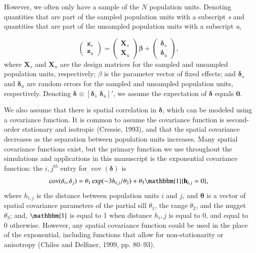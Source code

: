 \documentclass[]{elsarticle} %
\begin{document}
However, we often only have a sample of the \(N\) population units.
Denoting quantities that are part of the sampled population units with a
subscript \emph{s} and quantities that are part of the unsampled
population units with a subscript \emph{u},

\begin{equation}
\begin{pmatrix} \label{equation:Zmarginal}
    \mathbf{z}_s      \\
    \mathbf{z}_u
\end{pmatrix}
=
\begin{pmatrix}
  \mathbf{X}_s    \\
  \mathbf{X}_u
\end{pmatrix}
\bm{\beta} +
\begin{pmatrix}
\bm{\delta}_s    \\
\bm{\delta}_u
\end{pmatrix},
\end{equation} where \(\mathbf{X}_s\) and \(\mathbf{X}_u\) are the
design matrices for the sampled and unsampled population units,
respectively; \(\beta\) is the parameter vector of fixed effects; and
\(\bm{\delta}_s\) and \(\bm{\delta}_u\) are random errors for the
sampled and unsampled population units, respectively. Denoting
\(\bm{\delta} \equiv [\bm{\delta}_s \,\, \bm{\delta}_u]'\), we assume
the expectation of \(\bm{\delta}\) equals \(\mathbf{0}\).

We also assume that there is spatial correlation in \(\bm{\delta}\),
which can be modeled using a covariance function. It is common to assume
the covariance function is second-order stationary and isotropic
(Cressie, 1993), and that the spatial covariance decreases as the
separation between population units increases. Many spatial covariance
functions exist, but the primary function we use throughout the
simulations and applications in this manuscript is the exponential
covariance function: the \(i,j^{th}\) entry for
\(\mathop{\mathrm{{cov}}}(\bm{\delta})\) is \mbox{}
\begin{align}\label{equation:expcov}
\mathop{\mathrm{{cov}}}(\delta_i, \delta_j) = \theta_1\exp(-3h_{i,j}/\theta_2) + \theta_3\mathbbm{1}\{\mathbf{h}_{i,j} = 0\}, 
\end{align} where \(h_{i,j}\) is the distance between population units
\(i\) and \(j\), and \(\bm{\theta}\) is a vector of spatial covariance
parameters of the partial sill \(\theta_1\), the range \(\theta_2\), and
the nugget \(\theta_3\); and, \(\mathbbm{1}\) is equal to 1 when
distance \(h_i,j\) is equal to 0, and equal to 0 otherwise. However, any
spatial covariance function could be used in the place of the
exponential, including functions that allow for non-stationarity or
anisotropy (Chiles and Delfiner, 1999, pp. 80--93).
\end{document}
